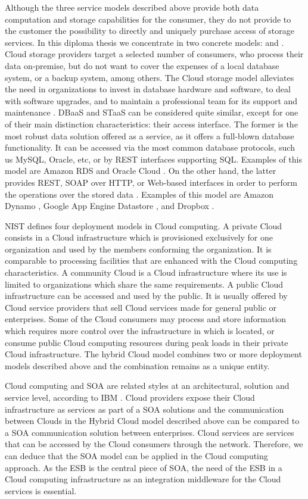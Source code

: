 Although the three service models described above provide both data computation and storage capabilities for the consumer, they do not provide to the customer the possibility to directly and uniquely purchase access of storage services. In this diploma thesis we concentrate in two concrete models:  and . Cloud storage providers target a selected number of consumers, who process their data on-premise, but do not  want to cover the expenses of a local database system, or a backup system, among others. The Cloud storage model alleviates the need in organizations to invest in database hardware and software, to deal with software upgrades, and to maintain a professional team for its support and maintenance \cite{dbaasIyer}.  \ac{DBaaS} and \ac{STaaS} can be considered quite similar, except for one of their main distinction characteristics: their access interface. The former is the most robust data solution offered as a service, as it offers a full-blown database functionality. It can be accessed via the most common database protocols, such us MySQL, Oracle, etc, or by REST interfaces supporting \ac{SQL}. Examples of this model are Amazon RDS \cite{amazonrds} and Oracle Cloud \cite{oraclecloud}. On the other hand, the latter provides REST, \ac{SOAP} over \ac{HTTP}, or Web-based interfaces in order to perform the operations over the stored data \cite{cloudstorageWU}. Examples of this model are Amazon Dynamo \cite{amazondynamodb} , Google App Engine Datastore \cite{googleappdatastore}, and Dropbox \cite{dropbox}.

\ac{NIST} defines four deployment models in Cloud computing. A private Cloud consists in a Cloud infrastructure which is provisioned exclusively for one organization and used by the members conforming the organization. It is comparable to processing facilities that are enhanced with the Cloud computing characteristics. A community Cloud is a Cloud infrastructure where its use is limited to organizations which share the same requirements. A public Cloud infrastructure can be accessed and used by the public. It is usually offered by Cloud service providers that sell Cloud services made for general public or enterprises. Some of the Cloud consumers may process and store information which requires more control over the infrastructure in which is located, or consume public Cloud computing resources during peak loads in their private Cloud infrastructure. The hybrid Cloud model combines two or more deployment models described above and the combination remains as a unique entity.  

Cloud computing and \ac{SOA} are related styles at an architectural, solution and service level, according to IBM \cite{IBM2011}. Cloud providers expose their Cloud infrastructure as services as part of a \ac{SOA} solutions and the communication between Clouds in the Hybrid Cloud model described above can be compared to a SOA communication solution between enterprises. Cloud services are services that can be accessed by the Cloud consumers through the network. Therefore, we can deduce that the SOA model can be applied in the Cloud computing approach. As the \ac{ESB} is the central piece of \ac{SOA}, the need of the \ac{ESB} in a Cloud computing infrastructure as an integration middleware for the Cloud services is essential. 